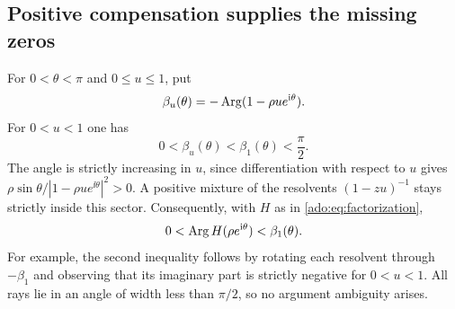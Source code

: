 \subsection{Positive compensation supplies the missing zeros}
For $0<\theta<\pi$ and $0\le u\le1$, put
\[
 \beta_u(\theta)=-\operatorname{Arg}(1-\rho u e^{\mathrm i\theta}).
\]
For $0<u<1$ one has
\begin{equation}\label{ado:eq:betasector}
 0<\beta_u(\theta)<\beta_1(\theta)<\frac\pi2.
\end{equation}
The angle is strictly increasing in $u$, since differentiation with
respect to $u$ gives $\rho\sin\theta/|1-\rho u e^{\ii\theta}|^2>0$.
A positive mixture of the resolvents $(1-zu)^{-1}$ stays strictly inside
this sector. Consequently, with $H$ as in
\eqref{ado:eq:factorization},
\begin{equation}\label{ado:eq:Hsector}
 0<\operatorname{Arg} H(\rho e^{\mathrm i\theta})<\beta_1(\theta).
\end{equation}
For example, the second inequality follows by rotating each resolvent
through $-\beta_1$ and observing that its imaginary part is strictly
negative for $0<u<1$. All rays lie in an angle of width less than
$\pi/2$, so no argument ambiguity arises.

